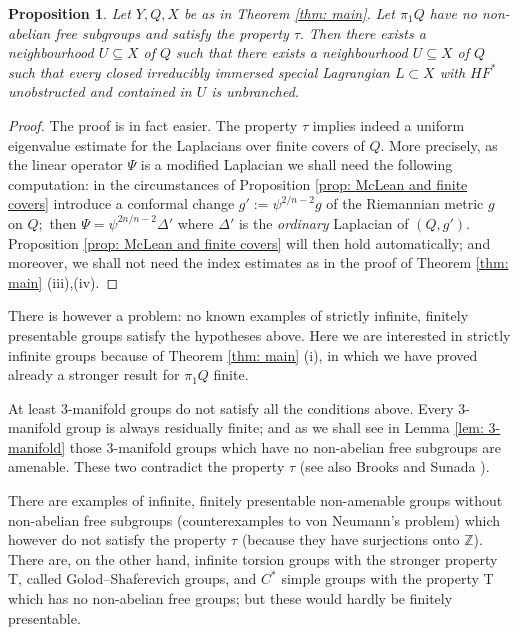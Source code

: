 \documentclass{article}
\theoremstyle{plain}%
\newtheorem{prop}[thm]{Proposition}
\theoremstyle{definition}
\numberwithin{equation}{section}
\numberwithin{figure}{section}
\def\l{\label}
\def\Z{{\mathbin{\mathbb Z}}}
\def\ps{\psi}
\def\Ps{\Psi}
\def\De{\Delta}
\def\sb{\subseteq}
\begin{document}
\begin{prop}\l{prop: strong pi1}
Let $Y,Q,X$ be as in Theorem \ref{thm: main}. Let $\pi_1Q$ have no non-abelian free subgroups and satisfy the property $\tau.$ Then there exists a neighbourhood $U\sb X$ of $Q$ such that there exists a neighbourhood $U\sb X$ of $Q$ such that every closed irreducibly immersed special Lagrangian $L\subset X$ with $HF^*$ unobstructed and contained in $U$ is unbranched. 
\end{prop}
\begin{proof}
The proof is in fact easier. The property $\tau$ implies indeed a uniform eigenvalue estimate \cite[Proposition 2.5]{LZ} for the Laplacians over finite covers of $Q.$ More precisely, as the linear operator $\Ps$ is a modified Laplacian we shall need the following computation: in the circumstances of Proposition \ref{prop: McLean and finite covers} introduce a conformal change $g':=\ps^{2/{n-2}}g$ of the Riemannian metric $g$ on $Q;$ then $\Ps=\ps^{2n/{n-2}}\De'$ where $\De'$ is the {\it ordinary} Laplacian of $(Q,g').$ Proposition \ref{prop: McLean and finite covers} will then hold automatically; and moreover, we shall not need the index estimates as in the proof of Theorem \ref{thm: main} (iii),(iv).
\end{proof}

There is however a problem: no known examples of strictly infinite, finitely presentable groups satisfy the hypotheses above. Here we are interested in strictly infinite groups because of Theorem \ref{thm: main} (i), in which we have proved already a stronger result for $\pi_1Q$ finite.

At least $3$-manifold groups do not satisfy all the conditions above. Every $3$-manifold group is always residually finite; and as we shall see in Lemma \ref{lem: 3-manifold} those $3$-manifold groups which have no non-abelian free subgroups are amenable. These two contradict the property $\tau$ \cite[Proposition 1.32]{LZ} (see also Brooks \cite{Br} and Sunada \cite{Sunada}).
  
There are examples \cite{Iv,LM,OS} of infinite, finitely presentable non-amenable groups without non-abelian free subgroups (counterexamples to von Neumann's problem) which however do not satisfy the property $\tau$ (because they have surjections onto $\Z$). There are, on the other hand, infinite torsion groups \cite{Ersh} with the stronger property T, called Golod--Shaferevich groups, and $C^*$ simple groups \cite{OO} with the property T which has no non-abelian free groups; but these would hardly be finitely presentable.
\end{document}
